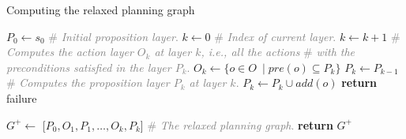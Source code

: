 \documentclass[ppgc,diss,english]{iiufrgs}
\begin{document}
\begin{algorithm}[tb]
\caption{Computing the relaxed planning graph}
\label{alg:computing-rpg}
\begin{algorithmic}[1]
  \State $P_{0} \gets s_{0}$ \textcolor{gray}{\# \emph{Initial proposition layer}.}
  \State $k \gets 0$ \textcolor{gray}{\# \emph{Index of current layer}.}
    \State $k \gets k + 1$
    \State \textcolor{gray}{\# \emph{Computes the action layer $O_{k}$ at layer $k$, i.e., all the actions}}
    \State \textcolor{gray}{\# \emph{with the preconditions satisfied in the layer $P_{k}$}.}
    \State $O_{k} \gets \{o \in O\ \mid pre(o) \subseteq P_{k}\}$
    \State $P_{k} \gets P_{k-1}$
      \State \textcolor{gray}{\# \emph{Computes the proposition layer $P_{k}$ at layer $k$}.}
      \State $P_{k} \gets P_{k} \cup add(o)$
    \EndFor
      \State \textbf{return} failure
    \EndIf

  \EndWhile

  \State $G^{+} \gets $ [$P_{0}, O_{1}, P_{1},\ldots,O_{k}, P_{k}$] \textcolor{gray}{\# \emph{The relaxed planning graph}.}
  \State \textbf{return} $G^{+}$
\EndProcedure
\end{algorithmic}
\end{algorithm}
\end{document}

